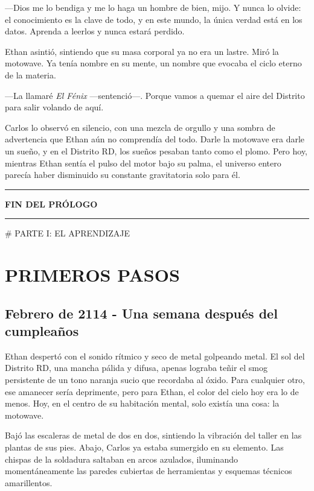 \documentclass[12pt,a4paper]{book}
\begin{document}
---Dios me lo bendiga y me lo haga un hombre de bien, mijo. Y nunca lo olvide: el conocimiento es la clave de todo, y en este mundo, la única verdad está en los datos. Aprenda a leerlos y nunca estará perdido.

Ethan asintió, sintiendo que su masa corporal ya no era un lastre. Miró la motowave. Ya tenía nombre en su mente, un nombre que evocaba el ciclo eterno de la materia.

---La llamaré \textit{El Fénix} ---sentenció---. Porque vamos a quemar el aire del Distrito para salir volando de aquí.

Carlos lo observó en silencio, con una mezcla de orgullo y una sombra de advertencia que Ethan aún no comprendía del todo. Darle la motowave era darle un sueño, y en el Distrito RD, los sueños pesaban tanto como el plomo. Pero hoy, mientras Ethan sentía el pulso del motor bajo su palma, el universo entero parecía haber disminuido su constante gravitatoria solo para él.

\bigskip
\noindent\rule{\textwidth}{0.4pt}
\bigskip

\textbf{FIN DEL PRÓLOGO}


\bigskip
\noindent\rule{\textwidth}{0.4pt}
\bigskip


# PARTE I: EL APRENDIZAJE

\chapter{PRIMEROS PASOS}

\section*{Febrero de 2114 - Una semana después del cumpleaños}

Ethan despertó con el sonido rítmico y seco de metal golpeando metal. El sol del Distrito RD, una mancha pálida y difusa, apenas lograba teñir el smog persistente de un tono naranja sucio que recordaba al óxido. Para cualquier otro, ese amanecer sería deprimente, pero para Ethan, el color del cielo hoy era lo de menos. Hoy, en el centro de su habitación mental, solo existía una cosa: la motowave.

Bajó las escaleras de metal de dos en dos, sintiendo la vibración del taller en las plantas de sus pies. Abajo, Carlos ya estaba sumergido en su elemento. Las chispas de la soldadura saltaban en arcos azulados, iluminando momentáneamente las paredes cubiertas de herramientas y esquemas técnicos amarillentos.
\end{document}

